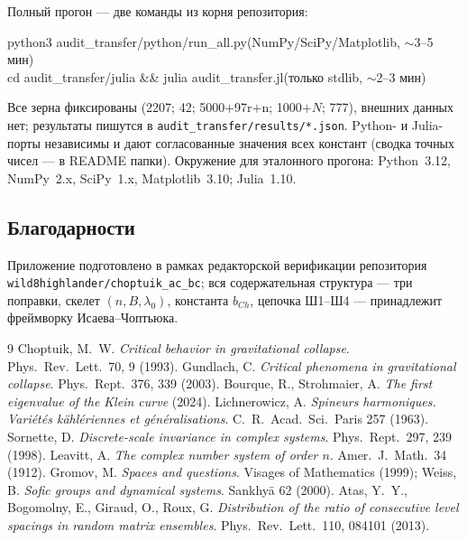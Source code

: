 \documentclass[11pt,a4paper]{article}
\theoremstyle{plain}
\theoremstyle{definition}
\theoremstyle{remark}
\begin{document}
Полный прогон --- две команды из корня репозитория:
\begin{flushleft}
\small\ttfamily
python3 audit\_transfer/python/run\_all.py\quad(NumPy/SciPy/Matplotlib,
$\sim$3--5 мин)\\
cd audit\_transfer/julia \&\& julia audit\_transfer.jl\quad(только stdlib,
$\sim$2--3 мин)
\end{flushleft}
Все зерна фиксированы (2207; 42; 5000$+$97r$+$n; 1000$+N$; 777), внешних
данных нет; результаты пишутся в \texttt{audit\_transfer/results/*.json}.
Python- и Julia-порты независимы и дают согласованные значения всех констант
(сводка точных чисел --- в README папки). Окружение для эталонного прогона:
Python~3.12, NumPy~2.x, SciPy~1.x, Matplotlib~3.10; Julia~1.10.

\subsection*{Благодарности}
Приложение подготовлено в рамках редакторской верификации репозитория
\texttt{wild8highlander/}\allowbreak\texttt{choptuik\_ac\_bc}; вся содержательная структура ---
три поправки, скелет $(n,B,\lambda_0)$, константа $b_{Ch}$, цепочка Ш1--Ш4 ---
принадлежит фреймворку Исаева--Чоптьюка.

\begin{thebibliography}{9}\small
{} Choptuik, M.~W. \emph{Critical behavior in
gravitational collapse}. Phys.\ Rev.\ Lett.\ 70, 9 (1993).
 Gundlach, C. \emph{Critical phenomena in gravitational
collapse}. Phys.\ Rept.\ 376, 339 (2003).
 Bourque, R., Strohmaier, A. \emph{The first eigenvalue
of the Klein curve} (2024).
 Lichnerowicz, A. \emph{Spineurs harmoniques.
Vari\'et\'es k\"ahl\'eriennes et g\'en\'eralisations}. C.~R.\ Acad.\ Sci.\
Paris 257 (1963).
 Sornette, D. \emph{Discrete-scale invariance in
complex systems}. Phys.\ Rept.\ 297, 239 (1998).
 Leavitt, A. \emph{The complex number system of order
$n$}. Amer.\ J.\ Math.\ 34 (1912).
 Gromov, M. \emph{Spaces and questions}. Visages of
Mathematics (1999); Weiss, B. \emph{Sofic groups and dynamical systems}.
Sankhy\=a 62 (2000).
 Atas, Y.~Y., Bogomolny, E., Giraud, O., Roux, G.
\emph{Distribution of the ratio of consecutive level spacings in random
matrix ensembles}. Phys.\ Rev.\ Lett.\ 110, 084101 (2013).
\end{thebibliography}
\end{document}
